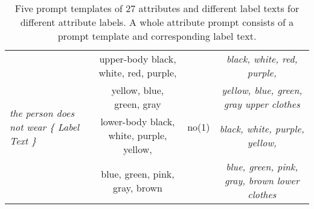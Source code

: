 \documentclass[sigconf]{acmart}
\begin{document}
\begin{table*}
\begin{center}
{\begin{tabular}{l|c|c|c}
\multirow{4}{*}{\textit{the person does not wear \{ Label Text \}}}
& upper-body black, white, red, purple,    & \multirow{4}{*}{no(1)}  & \textit{black, white, red, purple,} \\
& yellow, blue, green, gray                &                         & \textit{yellow, blue, green, gray upper clothes} \\
& lower-body black, white, purple, yellow, &                         & \textit{black, white, purple, yellow,} \\
& blue, green, pink, gray, brown           &                         & \textit{blue, green, pink, gray, brown lower clothes} \\
\hline

\end{tabular}}
\end{center}
\caption{Five prompt templates of 27 attributes and different label texts for different attribute labels. A whole attribute prompt consists of a prompt template and corresponding label text. 
}
\label{table:prompts}
\end{table*} 
\end{document}
